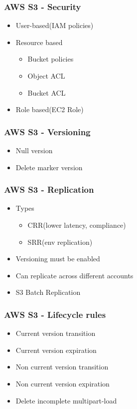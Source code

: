 \documentclass[../main.tex]{subfiles}
\begin{document}
\subsubsection{AWS S3 - Security}
\begin{itemize}
    \item User-based(IAM policies)
    \item Resource based
    \begin{itemize}
        \item Bucket policies
        \item Object ACL
        \item Bucket ACL
    \end{itemize}
    \item Role based(EC2 Role)
\end{itemize}

\subsubsection{AWS S3 - Versioning}
\begin{itemize}
    \item Null version
    \item Delete marker version
\end{itemize}

\subsubsection{AWS S3 - Replication}
\begin{itemize}
    \item Types
    \begin{itemize}
        \item CRR(lower latency, compliance)
        \item SRR(env replication)
    \end{itemize}
    \item Versioning must be enabled
    \item Can replicate across different accounts
    \item S3 Batch Replication
\end{itemize}

\subsubsection{AWS S3 - Lifecycle rules}
\begin{itemize}
    \item Current version transition
    \item Current version expiration
    \item Non current version transition
    \item Non current version expiration
    \item Delete incomplete multipart-load
\end{itemize}
\end{document}
